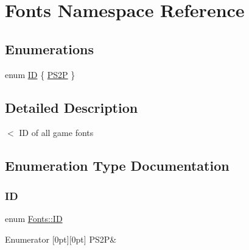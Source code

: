 \hypertarget{namespace_fonts}{}\section{Fonts Namespace Reference}
\label{namespace_fonts}
\subsection*{Enumerations}
\begin{DoxyCompactItemize}
\item 
enum \hyperlink{namespace_fonts_a240717ec0dc75e98501af734a02c396d}{ID} \{ \hyperlink{namespace_fonts_a240717ec0dc75e98501af734a02c396dab947c11fcf1d458feb7709e9c3733e65}{P\+S2P}
 \}
\end{DoxyCompactItemize}


\subsection{Detailed Description}
$<$ ID of all game fonts 

\subsection{Enumeration Type Documentation}
\mbox{\label{namespace_fonts_a240717ec0dc75e98501af734a02c396d}} 
\subsubsection{\texorpdfstring{ID}{ID}}
{\footnotesize\ttfamily enum \hyperlink{namespace_fonts_a240717ec0dc75e98501af734a02c396d}{Fonts\+::\+ID}}

\begin{DoxyEnumFields}{Enumerator}
[0pt][0pt]{}\mbox{\label{namespace_fonts_a240717ec0dc75e98501af734a02c396dab947c11fcf1d458feb7709e9c3733e65}} 
P\+S2P&\\
\hline

\end{DoxyEnumFields}
